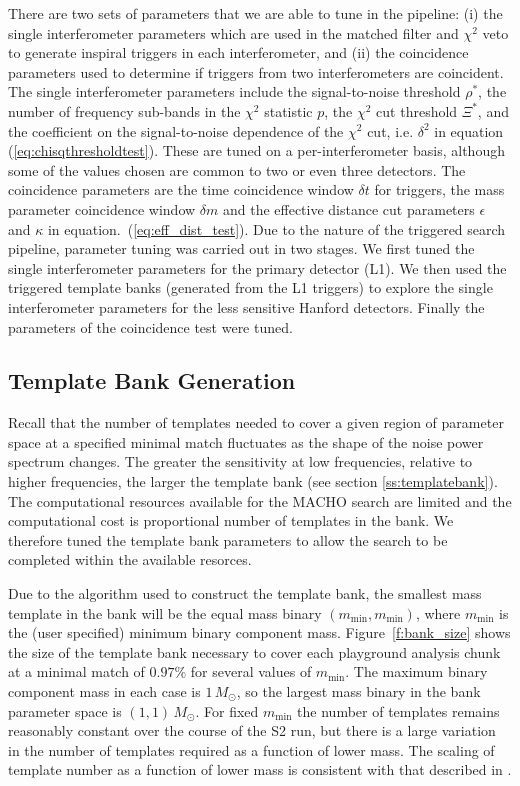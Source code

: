 There are two sets of parameters that we are able to tune in the pipeline: (i)
the single interferometer parameters which are used in the matched filter and
$\chi^2$ veto to generate inspiral triggers in each interferometer, and (ii)
the coincidence parameters used to determine if triggers from two
interferometers are coincident. The single interferometer parameters include
the signal-to-noise threshold $\rho^\ast$, the number of frequency sub-bands in
the $\chi^2$ statistic $p$, the $\chi^2$ cut threshold $\Xi^\ast$,  and the
coefficient on the signal-to-noise dependence of the $\chi^2$ cut, i.e.
$\delta^2$ in equation (\ref{eq:chisqthresholdtest}). These are tuned on a
per-interferometer basis, although some of the values chosen are common to two
or even three detectors.  The coincidence parameters are the time coincidence
window $\delta t$ for triggers, the mass parameter coincidence window $\delta
m$ and the effective distance cut parameters $\epsilon$ and $\kappa$ in
equation.~(\ref{eq:eff_dist_test}).  Due to the nature of the triggered search
pipeline, parameter tuning was carried out in two stages. We first tuned the
single interferometer parameters for the primary detector (L1).  We then used
the triggered template banks (generated from the L1 triggers) to explore the
single interferometer parameters for the less sensitive Hanford detectors.
Finally the parameters of the coincidence test were tuned.

\subsection{Template Bank Generation}
\label{ss:tunebank}

Recall that the number of templates needed to cover a given region of
parameter space at a specified minimal match fluctuates as the shape of the
noise power spectrum changes. The greater the sensitivity at low frequencies,
relative to higher frequencies, the larger the template bank (see section
\ref{ss:templatebank}). The computational resources available for the MACHO
search are limited and the computational cost is proportional number of
templates in the bank. We therefore tuned the template bank parameters to
allow the search to be completed within the available resorces.

Due to the algorithm used to construct the template bank\cite{Owen:1998dk}, the
smallest mass template in the bank will be the equal mass binary
$(m_\mathrm{min},m_\mathrm{min})$, where $m_\mathrm{min}$ is the (user
specified) minimum binary component mass. Figure~\ref{f:bank_size} shows the
size of the template bank necessary to cover each playground analysis chunk at
a minimal match of $0.97\%$ for several values of $m_\mathrm{min}$.  The
maximum binary component mass in each case is $1\,M_\odot$, so the largest
mass binary in the bank parameter space is $(1,1)\,M_\odot$. For fixed
$m_\mathrm{min}$ the number of templates remains reasonably constant over the
course of the S2 run, but there is a large variation in the number of templates
required as a function of lower mass. The scaling of template number
as a function of lower mass is consistent with that described in
\cite{Owen:1998dk}.

